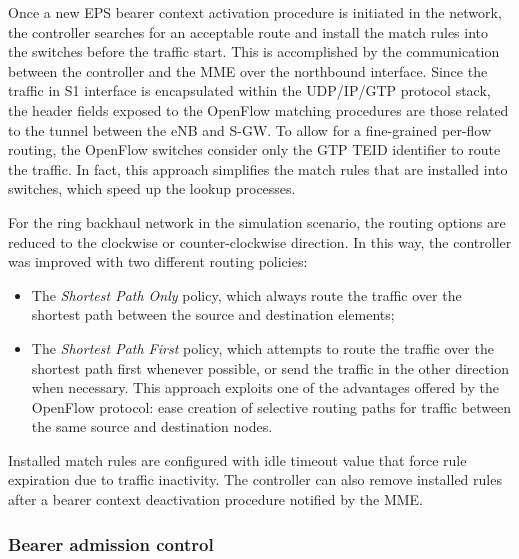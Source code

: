 Once a new \ac{EPS} bearer context activation procedure is initiated in the
network, the controller searches for an acceptable route and install the match
rules into the switches before the traffic start. This is accomplished by the
communication between the controller and the \ac{MME} over the northbound
interface. Since the traffic in S1 interface is encapsulated within the
\ac{UDP}/\ac{IP}/\ac{GTP} protocol stack, the header fields exposed to the
OpenFlow matching procedures are those related to the tunnel between the
\ac{eNB} and \ac{S-GW}. To allow for a fine-grained per-flow routing, the
OpenFlow switches consider only the \ac{GTP} \ac{TEID} identifier to route the
traffic. In fact, this approach simplifies the match rules that are installed
into switches, which speed up the lookup processes.

For the ring backhaul network in the simulation scenario, the routing options
are reduced to the clockwise or counter-clockwise direction. In this way, the
controller was improved with two different routing policies: 
\begin{itemize}
  \item The \emph{Shortest Path Only} policy, which always route the traffic
  over the shortest path between the source and destination elements;

  \item The \emph{Shortest Path First} policy, which attempts to route the
  traffic over the shortest path first whenever possible, or send the traffic
  in the other direction when necessary. This approach exploits one of the
  advantages offered by the OpenFlow protocol: ease creation of selective
  routing paths for traffic between the same source and destination nodes.
\end{itemize}

Installed match rules are configured with idle timeout value that force rule
expiration due to traffic inactivity. The controller can also remove installed
rules after a bearer context deactivation procedure notified by the \ac{MME}.

\subsubsection{Bearer admission control}
\label{subsec:admission}

